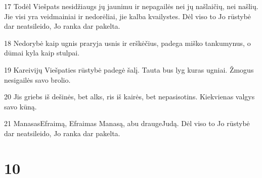 \par 17 Todėl Viešpats nesidžiaugs jų jaunimu ir nepagailės nei jų našlaičių, nei našlių. Jie visi yra veidmainiai ir nedorėliai, jie kalba kvailystes. Dėl viso to Jo rūstybė dar neatsileido, Jo ranka dar pakelta. 
\par 18 Nedorybė kaip ugnis praryja usnis ir erškėčius, padega miško tankumynus, o dūmai kyla kaip stulpai. 
\par 19 Kareivijų Viešpaties rūstybė padegė šalį. Tauta bus lyg kuras ugniai. Žmogus nesigailės savo brolio. 
\par 20 Jis griebs iš dešinės, bet alks, ris iš kairės, bet nepasisotins. Kiekvienas valgys savo kūną. 
\par 21 Manasas­Efraimą, Efraimas­ Manasą, abu drauge­Judą. Dėl viso to Jo rūstybė dar neatsileido, Jo ranka dar pakelta.



\chapter{10}


